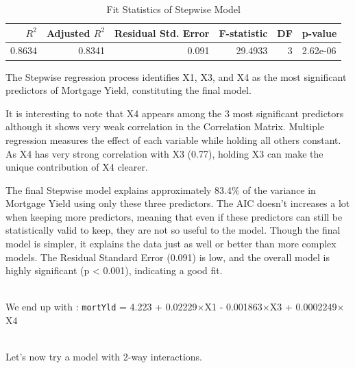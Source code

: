 \documentclass[
  11pt,
]{article}
\begin{document}
\addtocounter{table}{2}

\begin{table}[!h]
\centering
\caption{\label{tab:unnamed-chunk-8}Fit Statistics of Stepwise Model}
\centering
\fontsize{8}{10}\selectfont
\begin{tabular}[t]{rrrrrl}
\toprule
$R^2$ & Adjusted $R^2$ & Residual Std. Error & F-statistic & DF & p-value\\
\midrule
0.8634 & 0.8341 & 0.091 & 29.4933 & 3 & 2.62e-06\\
\bottomrule
\end{tabular}
\end{table}

The Stepwise regression process identifies X1, X3, and X4 as the most
significant predictors of Mortgage Yield, constituting the final model.

It is interesting to note that X4 appears among the 3 most significant
predictors although it shows very weak correlation in the Correlation
Matrix. Multiple regression measures the effect of each variable while
holding all others constant. As X4 has very strong correlation with X3
(0.77), holding X3 can make the unique contribution of X4 clearer.

The final Stepwise model explains approximately 83.4\% of the variance
in Mortgage Yield using only these three predictors. The AIC doesn't
increases a lot when keeping more predictors, meaning that even if these
predictors can still be statistically valid to keep, they are not so
useful to the model. Though the final model is simpler, it explains the
data just as well or better than more complex models. The Residual
Standard Error (0.091) is low, and the overall model is highly
significant (p \textless{} 0.001), indicating a good fit.\\
\strut \\
We end up with : \texttt{mortYld} = 4.223 + 0.02229\(\times\)X1 -
0.001863\(\times\)X3 + 0.0002249\(\times\)X4\\
\strut \\
Let's now try a model with 2-way interactions.
\end{document}
